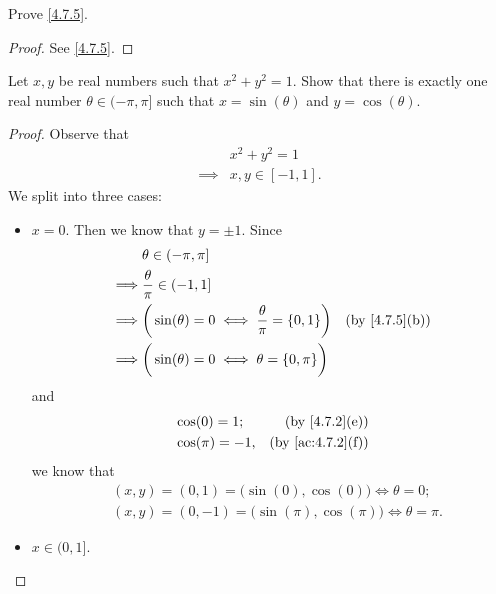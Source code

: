 \begin{ex}\label{ex:4.7.3}
  Prove \cref{4.7.5}.
\end{ex}

\begin{proof}
  See \cref{4.7.5}.
\end{proof}

\begin{ex}\label{ex:4.7.4}
  Let \(x, y\) be real numbers such that \(x^2 + y^2 = 1\).
  Show that there is exactly one real number \(\theta \in (-\pi, \pi]\) such that \(x = \sin(\theta)\) and \(y = \cos(\theta)\).
\end{ex}

\begin{proof}
  Observe that
  \begin{align*}
             & x^2 + y^2 = 1     \\
    \implies & x, y \in [-1, 1].
  \end{align*}
  We split into three cases:
  \begin{itemize}
    \item \(x = 0\).
          Then we know that \(y = \pm 1\).
          Since
          \begin{align*}
                     & \theta \in (-\pi, \pi]                                                                        \\
            \implies & \frac{\theta}{\pi} \in (-1, 1]                                                                \\
            \implies & \bigg(\sin(\theta) = 0 \iff \frac{\theta}{\pi} = \{0, 1\}\bigg) & \text{(by \cref{4.7.5}(b))} \\
            \implies & \bigg(\sin(\theta) = 0 \iff \theta = \{0, \pi\}\bigg)
          \end{align*}
          and
          \begin{align*}
             & \cos(0) = 1;    & \text{(by \cref{4.7.2}(e))}    \\
             & \cos(\pi) = -1, & \text{(by \cref{ac:4.7.2}(f))}
          \end{align*}
          we know that
          \begin{align*}
             & (x, y) = (0, 1) = \big(\sin(0), \cos(0)\big) \iff \theta = 0;        \\
             & (x, y) = (0, -1) = \big(\sin(\pi), \cos(\pi)\big) \iff \theta = \pi.
          \end{align*}
    \item \(x \in (0, 1]\).

\end{itemize}
\end{proof}
